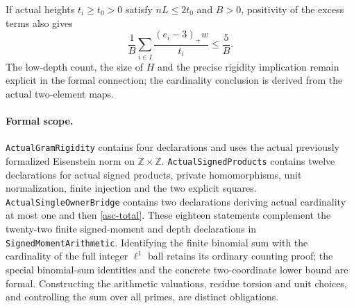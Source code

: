 If actual heights $t_i\ge t_0>0$ satisfy $nL\le2t_0$ and $B>0$,
positivity of the excess terms also gives
\[
 \frac1B\sum_{i\in I}\frac{(e_i-3)_+w}{t_i}\le\frac5B.
\]
The low-depth count, the size of $H$ and the precise rigidity
implication remain explicit in the formal connection; the cardinality
conclusion is derived from the actual two-element maps.

\paragraph{Formal scope.}
\texttt{ActualGram\allowbreak Rigidity} contains four declarations and
uses the actual previously formalized Eisenstein norm on
$\mathbb Z\times\mathbb Z$.
\texttt{ActualSigned\allowbreak Products} contains twelve declarations
for actual signed products, private homomorphisms, unit normalization,
finite injection and the two explicit squares.
\texttt{ActualSingleOwner\allowbreak Bridge} contains two declarations
deriving actual cardinality at most one and then
\eqref{asc-total}. These eighteen statements complement the twenty-two
finite signed-moment and depth declarations in
\texttt{SignedMoment\allowbreak Arithmetic}.
Identifying the finite binomial sum with the cardinality of the full
integer $\ell^1$ ball retains its ordinary counting proof; the special
binomial-sum identities and the concrete two-coordinate lower bound
are formal.
Constructing the arithmetic valuations, residue torsion and unit choices,
and controlling the sum over all primes, are distinct obligations.

